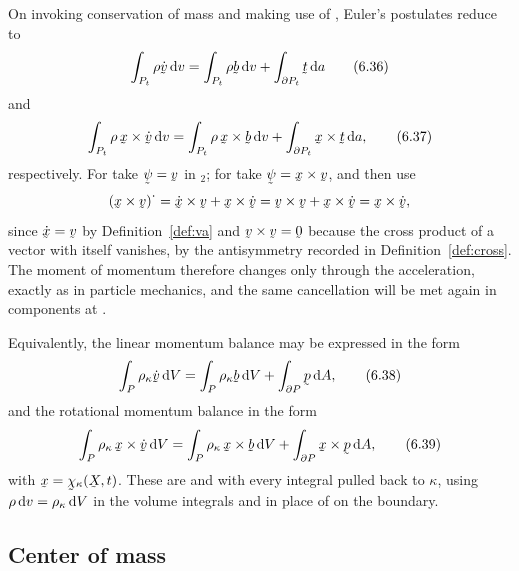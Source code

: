 On invoking conservation of mass and making use of , Euler's
postulates reduce to
\begin{equation}
   \int_{P_{t}}\rho\dot\bv\,\dl v=\int_{P_{t}}\rho\bb\,\dl v
   +\int_{\partial P_{t}}\bt\,\dl a
   \tag{6.36}\label{eq:6.36}
\end{equation}
and
\begin{equation}
   \int_{P_{t}}\rho\,\bx\times\dot\bv\,\dl v
   =\int_{P_{t}}\rho\,\bx\times\bb\,\dl v
   +\int_{\partial P_{t}}\bx\times\bt\,\dl a ,
   \tag{6.37}\label{eq:6.37}
\end{equation}
respectively. For  take $\vek\psi=\bv$ in $_{2}$;
for  take $\vek\psi=\bx\times\bv$, and then use
\[
   (\bx\times\bv)^{\textstyle\cdot}
   =\dot\bx\times\bv+\bx\times\dot\bv
   =\bv\times\bv+\bx\times\dot\bv
   =\bx\times\dot\bv ,
\]
since $\dot\bx=\bv$ by Definition~\ref{def:va} and $\bv\times\bv=\bze$
because the cross product of a vector with itself vanishes, by the
antisymmetry recorded in Definition~\ref{def:cross}. The moment of
momentum therefore changes only through the acceleration, exactly as in
particle mechanics, and the same cancellation will be met again in
components at .

Equivalently, the linear momentum balance may be expressed in the form
\begin{equation}
   \int_{P}\rho_{\kappa}\dot\bv\,\dl V=\int_{P}\rho_{\kappa}\bb\,\dl V
   +\int_{\partial P}\bp\,\dl A ,
   \tag{6.38}\label{eq:6.38}
\end{equation}
and the rotational momentum balance in the form
\begin{equation}
   \int_{P}\rho_{\kappa}\,\bx\times\dot\bv\,\dl V
   =\int_{P}\rho_{\kappa}\,\bx\times\bb\,\dl V
   +\int_{\partial P}\bx\times\bp\,\dl A ,
   \tag{6.39}\label{eq:6.39}
\end{equation}
with $\bx=\bchi_{\kappa}(\bX,t)$. These are  and 
with every integral pulled back to $\kappa$, using $\rho\,\mathrm{d} v
=\rho_{\kappa}\,\mathrm{d} V$ in the volume integrals and  in place
of  on the boundary.

\subsection{Center of mass}\label{sec:ch6com}

